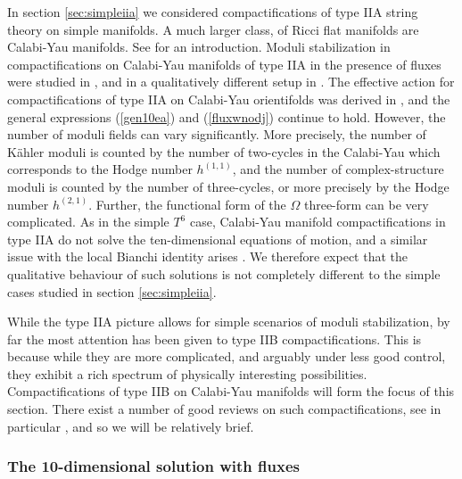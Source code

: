 \documentclass[11pt,a4paper]{article}
\numberwithin{equation}{section}
\numberwithin{table}{section}\setlength{\multlinegap}{25pt}
\begin{document}
In section \ref{sec:simpleiia} we considered compactifications of type IIA string theory on simple manifolds. A much larger class, of Ricci flat manifolds are Calabi-Yau manifolds. See \cite{Greene:1996cy,Hubsch:1992nu} for an introduction. Moduli stabilization in compactifications on Calabi-Yau manifolds of type IIA in the presence of fluxes were studied in \cite{DeWolfe:2005uu}, and in a qualitatively different setup in \cite{Palti:2008mg}. The effective action for compactifications of type IIA on Calabi-Yau orientifolds was derived in \cite{Louis:2002ny,Grimm:2004ua}, and the general expressions (\ref{gen10ea}) and (\ref{fluxwnodj}) continue to hold. However, the number of moduli fields can vary significantly. More precisely, the number of K{\"a}hler moduli is counted by the number of two-cycles in the Calabi-Yau which corresponds to the Hodge number $h^{(1,1)}$, and the number of complex-structure moduli is counted by the number of three-cycles, or more precisely by the Hodge number $h^{(2,1)}$. Further, the  functional form of the $\Omega$ three-form can be very complicated. As in the simple $T^6$ case, Calabi-Yau manifold compactifications in type IIA do not solve the ten-dimensional equations of motion, and a similar issue with the local Bianchi identity arises \cite{Acharya:2006ne}. We therefore expect that the qualitative behaviour of such solutions is not completely different to the simple cases studied in section \ref{sec:simpleiia}. 

While the type IIA picture allows for simple scenarios of moduli stabilization, by far the most attention has been given to type IIB compactifications. This is because while they are more complicated, and arguably under less good control, they exhibit a rich spectrum of physically interesting possibilities. Compactifications of type IIB on Calabi-Yau manifolds will form the focus of this section. There exist a number of good reviews on such compactifications, see in particular \cite{Douglas:2006es}, and so we will be relatively brief. 

\subsubsection{The 10-dimensional solution with fluxes}
\label{sec:iib10d}
\end{document}

